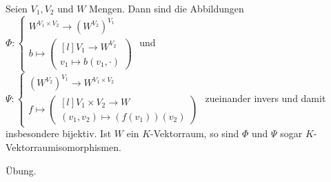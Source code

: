 \documentclass[../../main.tex]{subfiles}
\begin{document}
\begin{lem}\label{13.2.5} 
Seien $V_1,V_2$ und $W$ Mengen. Dann sind die Abbildungen\\ $\Phi: \begin{cases}W^{V_1\times V_2}\to(W^{V_2})^{V_1}\\
b\mapsto\begin{pmatrix*}[l]V_1\to W^{V_2}\\ v_1\mapsto b(v_1,\cdot)\end{pmatrix*}\end{cases}$ und $\Psi: \begin{cases}(W^{V_2})^{V_1}\to W^{V_1\times V_2}\\f\mapsto\begin{pmatrix*}[l] V_1\times V_2\to W\\ (v_1,v_2)\mapsto (f(v_1))(v_2)\end{pmatrix*}\end{cases}$ zueinander invers und damit insbesondere bijektiv. Ist $W$ ein $K$-Vektorraum, so sind $\Phi$ und $\Psi$ sogar $K$-Vektorraumisomorphismen.
\end{lem}
\begin{cproof}
Übung.
\end{cproof}
\end{document}
